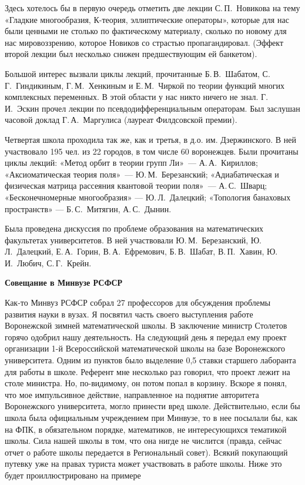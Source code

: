 Здесь хотелось бы в первую очередь отметить две лекции С.\,П.~Новикова на тему «Гладкие многообразия, К-теория, эллиптические операторы», которые для нас были ценными не столько по фактическому материалу, сколько по новому для нас мировоззрению, которое Новиков со страстью пропагандировал. (Эффект второй лекции был несколько снижен предшествующим ей банкетом).

Большой интерес вызвали циклы лекций,
прочитанные Б.\,В.~Шабатом, С.\,Г.~Гиндикиным,
Г.\,М.~Хенкиным и
\linebreak
Е.\,М.~Чиркой по теории функций многих комплексных переменных.
В этой области у нас никто ничего не знал.
Г.\,И.~Эскин прочел лекции по псевдодифференциальным операторам. Был заслушан часовой доклад Г.\,А.~Маргулиса (лауреат Филдсовской премии).

Четвертая школа проходила так же, как и третья, в д.о. им. Дзержинского.
В ней участвовало 195 чел. из 22 городов, в том числе 60 воронежцев.
Были прочитаны циклы лекций:
«Метод орбит в теории групп Ли»~--- А.\,А.~Кириллов;
«Аксиоматическая теория поля»~--- Ю.\,М.~Березанский;
«Адиабатическая и физическая матрица рассеяния квантовой теории поля»~--- А.\,С.~Шварц;
«Бесконечномерные многообразия» --- Ю.\,Л.~Далецкий;
«Топология банаховых пространств» --- Б.\,С.~Митягин, А.\,С.~Дынин.

Была проведена дискуссия по проблеме образования на математических факультетах университетов.
В ней участвовали Ю.\,М.~Березанский, Ю.\,Л.~Далецкий,
Е.\,А.~Горин, В.\,А.~Ефремович, Б.\,В.~Шабат, В.\,П.~Хавин, Ю.\,И.~Любич, С.\,Г.~Крейн.

{\bf Совещание в Минвузе РСФСР}

Как-то Минвуз РСФСР собрал 27 профессоров для обсуждения проблемы развития науки в вузах. Я посвятил часть своего выступления работе Воронежской зимней математической школы. В заключение министр Столетов горячо одобрил нашу деятельность. На следующий день я передал ему проект организации 1-й Всероссийской математической школы на базе Воронежского университета. Одним из пунктов было выделение 0,5 ставки старшего лаборанта для работы в школе. Референт мне несколько раз говорил, что проект лежит на столе министра. Но, по-видимому, он потом попал в корзину. Вскоре я понял, что мое импульсивное действие, направленное на поднятие авторитета Воронежского университета, могло принести вред школе. Действительно, если бы школа была официальным учреждением при Минвузе, то в нее посылали бы, как на ФПК, в обязательном порядке, математиков, не интересующихся тематикой школы. Сила нашей школы в том, что она нигде не числится (правда, сейчас отчет о работе школы передается в Региональный совет). Всякий покупающий путевку уже на правах туриста может участвовать в работе школы. Ниже это будет проиллюстрировано на примере

